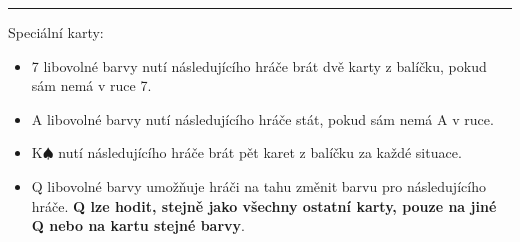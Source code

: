 \documentclass[a4paper,11pt]{article}
\begin{document}
\vspace{\parskip}
\hrule

Speciální karty:
\begin{itemize}
 \item 7 libovolné barvy nutí následujícího hráče brát dvě karty z balíčku,
  pokud sám nemá v ruce 7.
 \item A libovolné barvy nutí následujícího hráče stát, pokud sám nemá A v ruce.
 \item K$\spadesuit$ nutí následujícího hráče brát pět karet z balíčku za každé
  situace.
 \item Q libovolné barvy umožňuje hráči na tahu změnit barvu pro následujícího
  hráče. \textbf{Q lze hodit, stejně jako všechny ostatní karty, pouze na jiné
  Q nebo na kartu stejné barvy}.
\end{itemize}
\end{document}
